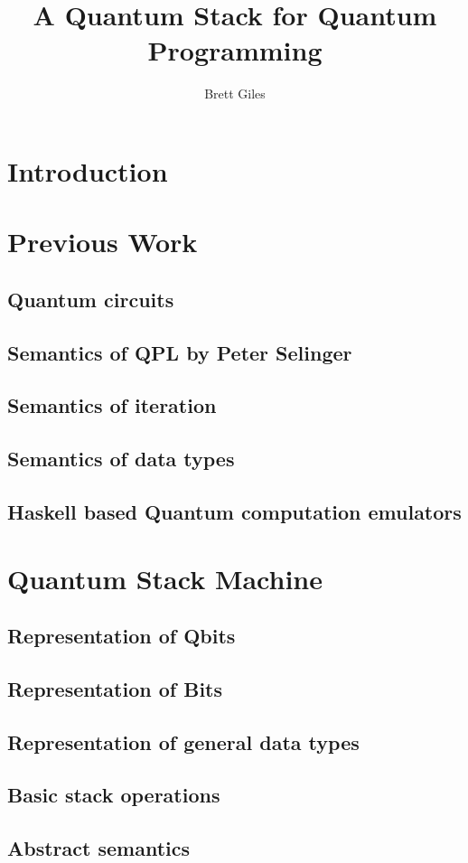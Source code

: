 \documentclass[12pt]{report}
\begin{document}
\author{Brett Giles}
\title{A Quantum Stack for Quantum Programming}
\maketitle
\tableofcontents{}
\chapter{Introduction}
\chapter{Previous Work}
\section{Quantum circuits}
\section{Semantics of QPL by Peter Selinger}
\section{Semantics of iteration}
\section{Semantics of data types}
\section{Haskell based Quantum computation emulators}
\chapter{Quantum Stack Machine}
\section{Representation of Qbits}
\section{Representation of Bits}
\section{Representation of general data types}
\section{Basic stack operations}
\section{Abstract semantics}
\end{document}
